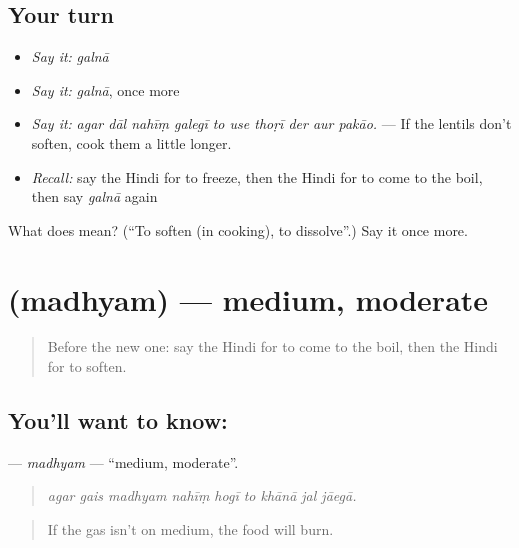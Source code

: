 \subsection*{Your turn}
\begin{itemize}
\raggedright
  \item \emph{Say it:} \emph{galnā}
  \item \emph{Say it:} \emph{galnā}, once more
  \item \emph{Say it:} \emph{agar dāl nahīṃ galegī to use thoṛī der aur pakāo.} — If the lentils don't soften, cook them a little longer.
  \item \emph{Recall:} say the Hindi for to freeze, then the Hindi for to come to the boil, then say \emph{galnā} again
\end{itemize}

\begin{tcolorbox}[breakable,colback=teal!4,colframe=teal!35!black,title={Before you move on}]
What does  mean? (\textquotedblleft{}To soften (in cooking), to dissolve\textquotedblright{}.) Say it once more.
\end{tcolorbox}
\section[\texorpdfstring{\hi{मध्यम} (madhyam)}{मध्यम (madhyam)}]{ (madhyam) — medium, moderate}

\label{lesson:HI-C384-madhyam}



\begin{quote}
Before the new one: say the Hindi for to come to the boil, then the Hindi for to soften.
\end{quote}

\subsection*{You'll want to know: }
\textbf{} — \emph{madhyam} — \textquotedblleft{}medium, moderate\textquotedblright{}.

\begin{quote}
        
\end{quote}

\begin{quote}
\emph{agar gais madhyam nahīṃ hogī to khānā jal jāegā.}
\end{quote}

\begin{quote}
If the gas isn't on medium, the food will burn.
\end{quote}

